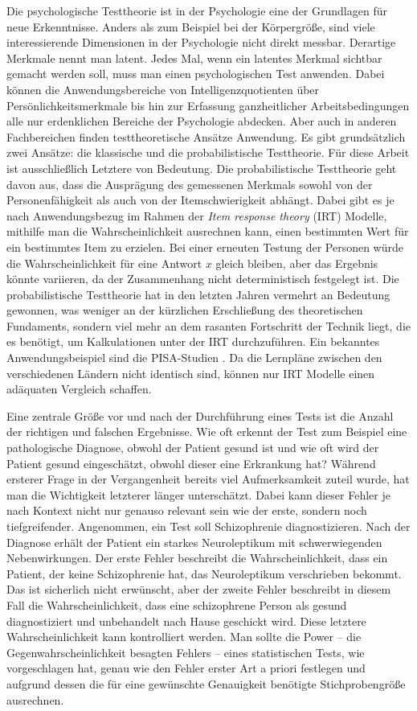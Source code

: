 \documentclass[12pt]{article} %
\begin{document}
	Die psychologische Testtheorie ist in der Psychologie eine der Grundlagen für neue Erkenntnisse. Anders als zum Beispiel bei der Körpergröße, sind viele interessierende Dimensionen in der Psychologie nicht direkt messbar. Derartige Merkmale nennt man latent. Jedes Mal, wenn ein latentes Merkmal sichtbar gemacht werden soll, muss man einen psychologischen Test anwenden. Dabei können die Anwendungsbereiche von Intelligenzquotienten über Persönlichkeitsmerkmale bis hin zur Erfassung ganzheitlicher Arbeitsbedingungen alle nur erdenklichen Bereiche der Psychologie abdecken. Aber auch in anderen Fachbereichen finden testtheoretische Ansätze Anwendung. Es gibt grundsätzlich zwei Ansätze: die klassische und die probabilistische Testtheorie. Für diese Arbeit ist ausschließlich Letztere von Bedeutung. Die probabilistische Testtheorie geht davon aus, dass die Ausprägung des gemessenen Merkmals sowohl von der Personenfähigkeit als auch von der Itemschwierigkeit abhängt. Dabei gibt es je nach Anwendungsbezug im Rahmen der \textit{Item response theory} (IRT) Modelle, mithilfe man die Wahrscheinlichkeit ausrechnen kann, einen bestimmten Wert für ein bestimmtes Item zu erzielen. Bei einer erneuten Testung der Personen würde die Wahrscheinlichkeit für eine Antwort $x$ gleich bleiben, aber das Ergebnis könnte variieren, da der Zusammenhang nicht deterministisch festgelegt ist. Die probabilistische Testtheorie hat in den letzten Jahren vermehrt an Bedeutung gewonnen, was weniger an der kürzlichen Erschließung des theoretischen Fundaments, sondern viel mehr an dem rasanten Fortschritt der Technik liegt, die es benötigt, um Kalkulationen unter der IRT durchzuführen. Ein bekanntes Anwendungsbeispiel sind die PISA-Studien \citep*{prenzel2007pisa}. Da die Lernpläne zwischen den verschiedenen Ländern nicht identisch sind, können nur IRT Modelle einen adäquaten Vergleich schaffen.
	
	Eine zentrale Größe vor und nach der Durchführung eines Tests ist die Anzahl der richtigen und falschen Ergebnisse. Wie oft erkennt der Test zum Beispiel eine pathologische Diagnose, obwohl der Patient gesund ist und wie oft wird der Patient gesund eingeschätzt, obwohl dieser eine Erkrankung hat? Während ersterer Frage in der Vergangenheit bereits viel Aufmerksamkeit zuteil wurde, hat man die Wichtigkeit letzterer länger unterschätzt. Dabei kann dieser Fehler je nach Kontext nicht nur genauso relevant sein wie der erste, sondern noch tiefgreifender. Angenommen, ein Test soll Schizophrenie diagnostizieren. Nach der Diagnose erhält der Patient ein starkes Neuroleptikum mit schwerwiegenden Nebenwirkungen. Der erste Fehler beschreibt die Wahrscheinlichkeit, dass ein Patient, der keine Schizophrenie hat, das Neuroleptikum verschrieben bekommt. Das ist sicherlich nicht erwünscht, aber der zweite Fehler beschreibt in diesem Fall die Wahrscheinlichkeit, dass eine schizophrene Person als gesund diagnostiziert und unbehandelt nach Hause geschickt wird. Diese letztere Wahrscheinlichkeit kann kontrolliert werden. Man sollte die Power -- die Gegenwahrscheinlichkeit besagten Fehlers -- eines statistischen Tests, wie \citet{draxler2010sample} vorgeschlagen hat, genau wie den Fehler erster Art a priori festlegen und aufgrund dessen die für eine gewünschte Genauigkeit benötigte Stichprobengröße ausrechnen. 
	
\end{document}
